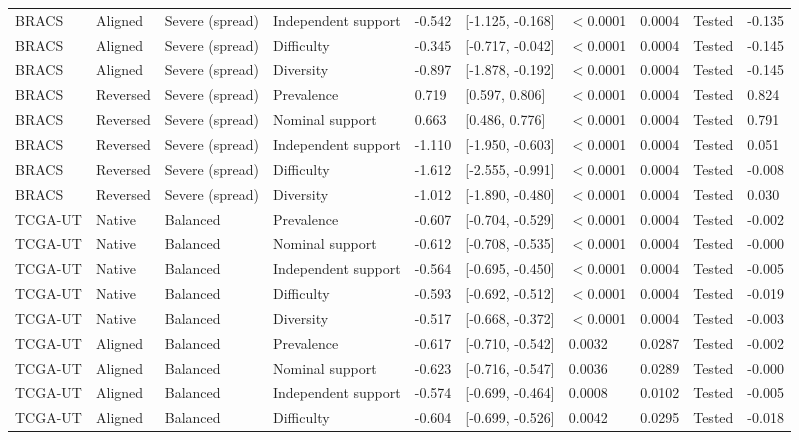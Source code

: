 \begin{longtable}{llllllllll}
BRACS & Aligned & Severe (spread) & Independent support & -0.542 & [-1.125, -0.168] & $<$0.0001 & 0.0004 & Tested & -0.135 \\
BRACS & Aligned & Severe (spread) & Difficulty & -0.345 & [-0.717, -0.042] & $<$0.0001 & 0.0004 & Tested & -0.145 \\
BRACS & Aligned & Severe (spread) & Diversity & -0.897 & [-1.878, -0.192] & $<$0.0001 & 0.0004 & Tested & -0.145 \\
BRACS & Reversed & Severe (spread) & Prevalence & 0.719 & [0.597, 0.806] & $<$0.0001 & 0.0004 & Tested & 0.824 \\
BRACS & Reversed & Severe (spread) & Nominal support & 0.663 & [0.486, 0.776] & $<$0.0001 & 0.0004 & Tested & 0.791 \\
BRACS & Reversed & Severe (spread) & Independent support & -1.110 & [-1.950, -0.603] & $<$0.0001 & 0.0004 & Tested & 0.051 \\
BRACS & Reversed & Severe (spread) & Difficulty & -1.612 & [-2.555, -0.991] & $<$0.0001 & 0.0004 & Tested & -0.008 \\
BRACS & Reversed & Severe (spread) & Diversity & -1.012 & [-1.890, -0.480] & $<$0.0001 & 0.0004 & Tested & 0.030 \\
TCGA-UT & Native & Balanced & Prevalence & -0.607 & [-0.704, -0.529] & $<$0.0001 & 0.0004 & Tested & -0.002 \\
TCGA-UT & Native & Balanced & Nominal support & -0.612 & [-0.708, -0.535] & $<$0.0001 & 0.0004 & Tested & -0.000 \\
TCGA-UT & Native & Balanced & Independent support & -0.564 & [-0.695, -0.450] & $<$0.0001 & 0.0004 & Tested & -0.005 \\
TCGA-UT & Native & Balanced & Difficulty & -0.593 & [-0.692, -0.512] & $<$0.0001 & 0.0004 & Tested & -0.019 \\
TCGA-UT & Native & Balanced & Diversity & -0.517 & [-0.668, -0.372] & $<$0.0001 & 0.0004 & Tested & -0.003 \\
TCGA-UT & Aligned & Balanced & Prevalence & -0.617 & [-0.710, -0.542] & 0.0032 & 0.0287 & Tested & -0.002 \\
TCGA-UT & Aligned & Balanced & Nominal support & -0.623 & [-0.716, -0.547] & 0.0036 & 0.0289 & Tested & -0.000 \\
TCGA-UT & Aligned & Balanced & Independent support & -0.574 & [-0.699, -0.464] & 0.0008 & 0.0102 & Tested & -0.005 \\
TCGA-UT & Aligned & Balanced & Difficulty & -0.604 & [-0.699, -0.526] & 0.0042 & 0.0295 & Tested & -0.018 \\

\end{longtable}
